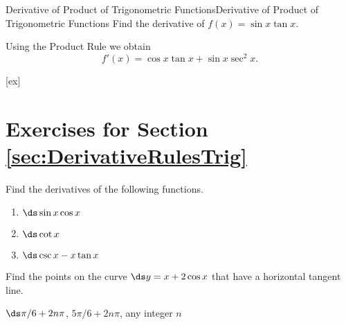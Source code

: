 \begin{example}{Derivative of Product of Trigonometric Functions}{Derivative of Product of Trigonometric Functions}
Find the derivative of $f(x)=\sin x\tan x$.
\end{example}

\begin{solution} 
Using the Product Rule we obtain
$$f'(x)=\cos x\tan x+\sin x\sec^2x.$$
\end{solution}


[ex]
\section*{Exercises for Section \ref{sec:DerivativeRulesTrig}}

\begin{enumialphparenastyle}
\begin{ex} 
Find the derivatives of the following functions.
\begin{multicols}{3}
\begin{enumerate}
	\item	$\ds \sin x\cos x$
	\item	$\ds \cot x$
	\item	$\ds\csc x-x\tan x$
\end{enumerate}
\end{multicols}
\end{ex}

\begin{ex} 
Find the points on the curve $\ds y= x+ 2\cos x$ that have a
horizontal tangent line.
\begin{sol} 
$\ds \pi/6+2n\pi$, $5\pi/6+2n\pi$, any integer $n$
\end{sol}
\end{ex}

\end{enumialphparenastyle}